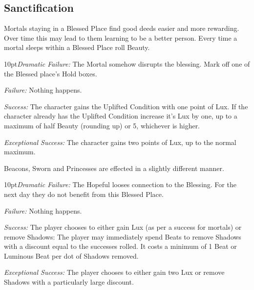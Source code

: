 \subsection*{Sanctification}

Mortals staying in a Blessed Place find good deeds easier and more rewarding. Over time this may lead to them learning to be a better person. Every time a mortal sleeps within a Blessed Place roll Beauty.

    \begin{myindentpar}{10pt}\emph{Dramatic Failure:} The Mortal somehow disrupts the blessing. Mark off one of the Blessed place’s Hold boxes.
    
    \emph{Failure:} Nothing happens. 
    
    \emph{Success:} The character gains the Uplifted Condition with one point of Lux. If the character already has the Uplifted Condition increase it's Lux by one, up to a maximum of half Beauty (rounding up) or 5, whichever is higher. 
    
    \emph{Exceptional Success:} The character gains two points of Lux, up to the normal maximum. \end{myindentpar}

\noindent Beacons, Sworn and Princesses are effected in a slightly different manner.

    \begin{myindentpar}{10pt}\emph{Dramatic Failure:} The Hopeful looses connection to the Blessing. For the next day they do not benefit from this Blessed Place. 
    
    \emph{Failure:} Nothing happens. 
    
    \emph{Success:} The player chooses to either gain Lux (as per a success for mortals) or remove Shadows: The player may immediately spend Beats to remove Shadows with a discount equal to the successes rolled. It costs a minimum of 1 Beat or Luminous Beat per dot of Shadows removed. 
    
    \emph{Exceptional Success:} The player chooses to either gain two Lux or remove Shadows with a particularly large discount. \end{myindentpar}
	
	


